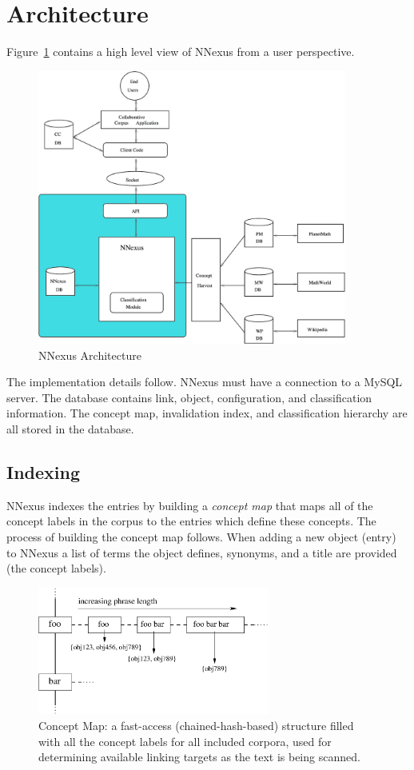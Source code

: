 \documentclass{article}
\begin{document}
\section{Architecture}
Figure~\ref{arch} contains a high level view of NNexus from a user perspective.
\begin{figure}[ht]
\centerline{\includegraphics[width=4in]{figures/nnexus-arch}}
\caption{NNexus Architecture}
\label{arch}
\end{figure}


The implementation details follow. NNexus must have a connection to a MySQL
server. The database contains link, object, configuration, and classification
information. The concept map, invalidation index, and classification hierarchy
are all stored in the database.

\subsection{Indexing}
\label{SecIndexing}

NNexus indexes the entries by building a \emph{concept map} that maps all of the concept labels in the corpus to the entries which define these concepts.  The process of building the concept map follows. When adding a new object (entry) to NNexus a list of terms the object defines, synonyms, and a title are provided (the concept labels).

\begin{figure}
\centerline{\includegraphics[width=3in]{figures/struct_concept_map}}
\caption{Concept Map: a fast-access (chained-hash-based) structure filled with all the concept labels for all included corpora, used for determining available linking targets as the text is being scanned.}
\label{ConceptMap}
\end{figure}
\end{document}
